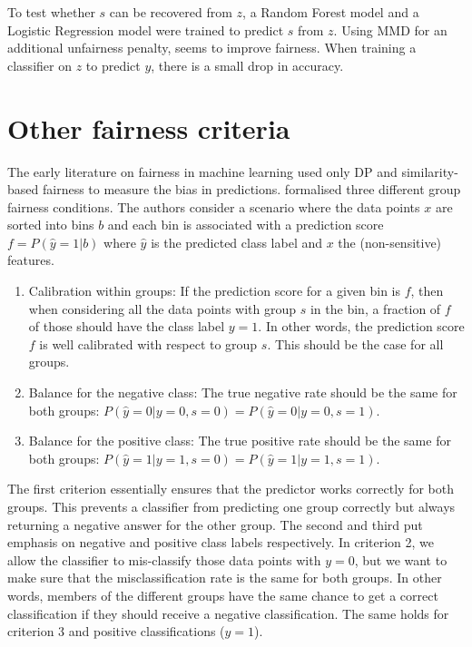 To test whether \(s\) can be recovered from \(z\),
a Random Forest model and a Logistic Regression model were trained to predict \(s\) from \(z\).
Using \ac{MMD} for an additional unfairness penalty, seems to improve fairness.
When training a classifier on \(z\) to predict \(y\), there is a small drop in accuracy.

\section{Other fairness criteria}%
\label{improved-definitions-of-fairness}
The early literature on fairness in machine learning used only \ac{DP}
and si\-mi\-la\-ri\-ty-based fairness to measure the bias in predictions.
\citet{kleinberg2016inherent} formalised three different group fairness conditions.
The authors consider a scenario where the data points \(x\) are sorted into bins \(b\)
and each bin is associated with a prediction score \(f = P(\hat{y}=1|b)\)
where \(\hat{y}\) is the predicted class label and \(x\) the (non-sensitive) features.
\begin{enumerate}
\item
  Calibration within groups:
  If the prediction score for a given bin is \(f\),
  then when considering all the data points with group \(s\) in the bin,
  a fraction of \(f\) of those should have the class label \(y=1\).
  In other words, the prediction score \(f\) is well calibrated with respect to group \(s\).
  This should be the case for all groups.
\item
  Balance for the negative class:
  The true negative rate should be the same for both groups: \(P(\hat{y}=0|y=0,s=0) = P(\hat{y}=0|y=0,s=1)\).
\item
  Balance for the positive class:
  The true positive rate should be the same for both groups: \(P(\hat{y}=1|y=1,s=0) = P(\hat{y}=1|y=1,s=1)\).
\end{enumerate}
The first criterion essentially ensures that the predictor works correctly for both groups.
This prevents a classifier from predicting one group correctly
but always returning a negative answer for the other group.
The second and third put emphasis on negative and positive class labels respectively.
In criterion 2, we allow the classifier to mis-classify those data points with \(y=0\),
but we want to make sure that the misclassification rate is the same for both groups.
In other words, members of the different groups have the same chance
to get a correct classification if they should receive a negative classification.
The same holds for criterion 3 and positive classifications (\(y=1\)).

